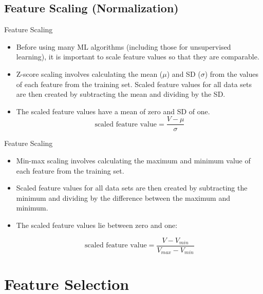 \documentclass[11pt]{beamer}
\begin{document}
\subsection{Feature Scaling (Normalization) \\ \scalebox{0.8}{}}
\begin{frame}{Feature Scaling}
	\begin{itemize}
		\item Before using many ML algorithms (including those for unsupervised learning), it is important to scale feature values so that they are comparable.
		\item  Z-score scaling involves calculating the mean ($\mu$) and SD ($\sigma$) from the values of each feature from the training set. Scaled feature values for all data sets are then created by subtracting the mean and dividing by the SD. 
\item The scaled feature values have a mean of zero and SD of one.
		\begin{equation}
		\text{scaled feature value} = \frac{V-\mu}{\sigma}
		\end{equation}
	\end{itemize}
\end{frame}
\begin{frame}{Feature Scaling}
	\begin{itemize}
		\item Min-max scaling involves calculating the maximum and minimum value of each feature from the training set. 
		\item Scaled feature values for all data sets are then created by subtracting the minimum and dividing by the difference between the maximum and minimum. 
		\item The scaled feature values lie between zero and one:
		
				\begin{equation}
		\text{scaled feature value} = \frac{V-V_{min}}{V_{max}-V_{min}}
		\end{equation}
	\end{itemize}
\end{frame}
\section{Feature Selection}
\end{document}
